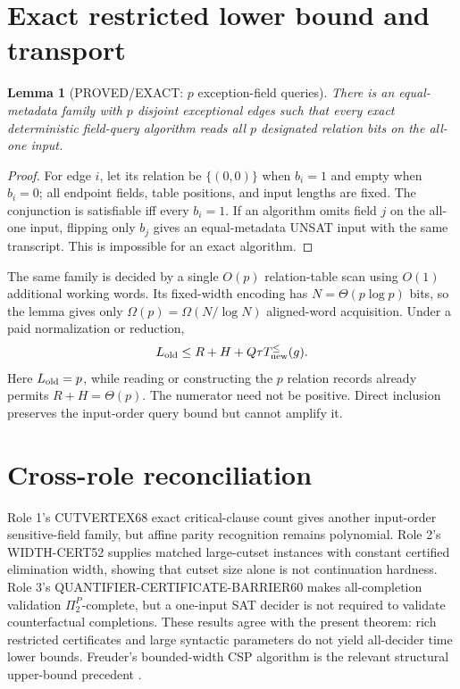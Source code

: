 \documentclass[11pt]{article}
\newtheorem{lemma}{Lemma}
\begin{document}
\section{Exact restricted lower bound and transport}
\begin{lemma}[PROVED/EXACT: $p$ exception-field queries]
There is an equal-metadata family with $p$ disjoint exceptional edges such
that every exact deterministic field-query algorithm reads all $p$ designated
relation bits on the all-one input.
\end{lemma}
\begin{proof}
For edge $i$, let its relation be $\{(0,0)\}$ when $b_i=1$ and empty when
$b_i=0$; all endpoint fields, table positions, and input lengths are fixed.
The conjunction is satisfiable iff every $b_i=1$. If an algorithm omits
field $j$ on the all-one input, flipping only $b_j$ gives an equal-metadata
UNSAT input with the same transcript. This is impossible for an exact
algorithm.
\end{proof}

The same family is decided by a single $O(p)$ relation-table scan using
$O(1)$ additional working words. Its fixed-width encoding has
$N=\Theta(p\log p)$ bits, so the lemma gives only
$\Omega(p)=\Omega(N/\log N)$ aligned-word acquisition. Under a paid
normalization or reduction,
\[
L_{\rm old}\le R+H+Q\tau T_{\rm new}^{\le}(g).
\]
Here $L_{\rm old}=p$, while reading or constructing the $p$ relation records
already permits $R+H=\Theta(p)$. The numerator need not be positive.
Direct inclusion preserves the input-order query bound but cannot amplify it.

\section{Cross-role reconciliation}
Role 1's CUTVERTEX68 exact critical-clause count gives another input-order
sensitive-field family, but affine parity recognition remains polynomial.
Role 2's WIDTH-CERT52 supplies matched large-cutset instances with constant
certified elimination width, showing that cutset size alone is not
continuation hardness. Role 3's QUANTIFIER-CERTIFICATE-BARRIER60 makes
all-completion validation $\Pi_2^P$-complete, but a one-input SAT decider is
not required to validate counterfactual completions. These results agree
with the present theorem: rich restricted certificates and large syntactic
parameters do not yield all-decider time lower bounds. Freuder's
bounded-width CSP algorithm is the relevant structural upper-bound precedent
\cite{freuder}.
\end{document}
